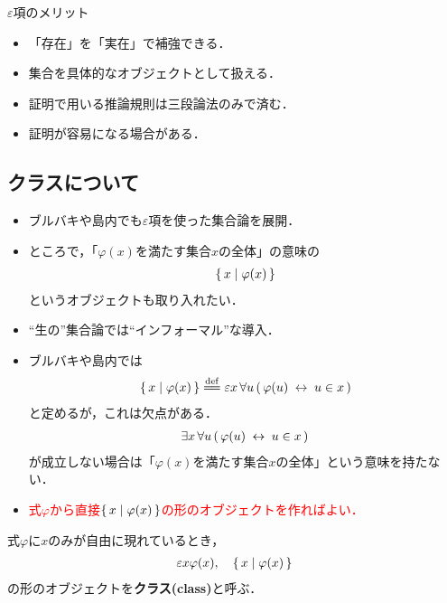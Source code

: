 	\begin{itembox}[l]{$\varepsilon$項のメリット}
		\begin{itemize}
			\item 「存在」を「実在」で補強できる．
			\item 集合を具体的なオブジェクトとして扱える．
			\item 証明で用いる推論規則は三段論法のみで済む．
			\item 証明が容易になる場合がある．
		\end{itemize}
	\end{itembox}
	
\newpage
\subsection{クラスについて}
	\begin{itemize}
	\setlength{\itemsep}{10pt}
		\item ブルバキ\cite{}や島内\cite{}でも$\varepsilon$項を使った集合論を展開．
		
		\item ところで，「$\varphi(x)$を満たす集合$x$の全体」の意味の
			\begin{align}
				\left\{\, x \mid \varphi(x)\, \right\}
			\end{align}
			というオブジェクトも取り入れたい．
		
		\item ``生の''集合論では``インフォーマル''な導入．
		
		\item ブルバキ\cite{}や島内\cite{}では
			\begin{align}
				\Set{x}{\varphi(x)} \defeq \varepsilon x\, \forall u\, 
				(\, \varphi(u) \lrarrow u \in x\, )
			\end{align}
			と定めるが，これは欠点がある．
			\begin{align}
				\exists x\, \forall u\, (\, \varphi(u) \hspace{0.25em}\leftrightarrow\hspace{0.25em} u \in x\, )
			\end{align}
			が成立しない場合は「$\varphi(x)$を満たす集合$x$の全体」という意味を持たない．
			
		\item \textcolor{red}{式$\varphi$から直接$\left\{\, x \mid \varphi(x)\, \right\}$の形のオブジェクトを作ればよい．}
	\end{itemize}
	
\newpage
	\begin{screen}
		\begin{dfn}[クラス]
			式$\varphi$に$x$のみが自由に現れているとき，
			\begin{align}
				\varepsilon x \varphi(x), \quad \left\{\, x \mid \varphi(x)\, \right\}
			\end{align}
			の形のオブジェクトを{\bf クラス(class)}と呼ぶ．
		\end{dfn}
	\end{screen}
	
